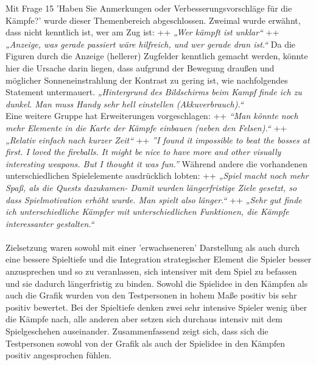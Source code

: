 \documentclass[extern,palatino]{cgBA}
\begin{document}
Mit Frage 15 'Haben Sie Anmerkungen oder Verbesserungsvorschläge für die Kämpfe?' wurde dieser Themenbereich abgeschlossen. Zweimal wurde erwähnt, dass nicht kenntlich ist, wer am Zug ist: ++  \textit{„Wer kämpft ist unklar“} ++ \textit{„Anzeige, was gerade passiert wäre hilfreich, und wer gerade dran ist.“} Da die Figuren durch die Anzeige (hellerer) Zugfelder kenntlich gemacht werden, könnte hier die Ursache darin liegen, dass aufgrund der Bewegung draußen und möglicher Sonneneinstrahlung der Kontrast zu gering ist, wie nachfolgendes Statement untermauert. \textit{„Hintergrund des Bildschirms beim Kampf finde ich zu dunkel. Man muss Handy sehr hell einstellen (Akkuverbrauch).“}\\
Eine weitere Gruppe hat Erweiterungen vorgeschlagen: ++  \textit{“Man könnte noch mehr Elemente in die Karte der Kämpfe einbauen (neben den Felsen).“} ++ \textit{„Relativ einfach nach kurzer Zeit“} ++ \textit{”I found it impossible to beat the bosses at first. I loved the fireballs. It might be nice to have more and other visually interesting weapons. But I thought it was fun.”} Während andere die vorhandenen unterschiedlichen Spielelemente ausdrücklich lobten: ++ \textit{„Spiel macht noch mehr Spaß, als die Quests dazukamen- Damit wurden längerfristige Ziele gesetzt, so dass Spielmotivation erhöht wurde. Man spielt also länger.“} ++ \textit{„Sehr gut finde ich unterschiedliche Kämpfer mit unterschiedlichen Funktionen, die Kämpfe interessanter gestalten.“}
\\
\\
Zielsetzung waren sowohl mit einer 'erwachseneren' Darstellung als auch durch eine bessere Spieltiefe und die Integration strategischer Element die Spieler besser anzusprechen und so zu veranlassen, sich intensiver mit dem Spiel zu befassen und sie dadurch längerfristig zu binden. Sowohl die Spielidee in den Kämpfen als auch die Grafik wurden von den Testpersonen in hohem Maße positiv bis sehr positiv bewertet. Bei der Spieltiefe denken zwei sehr intensive Spieler wenig über die Kämpfe nach, alle anderen aber setzen sich durchaus intensiv mit dem Spielgeschehen auseinander. Zusammenfassend zeigt sich, dass sich die Testpersonen sowohl von der Grafik als auch der Spielidee in den Kämpfen positiv angesprochen fühlen.
\newpage
\end{document}
